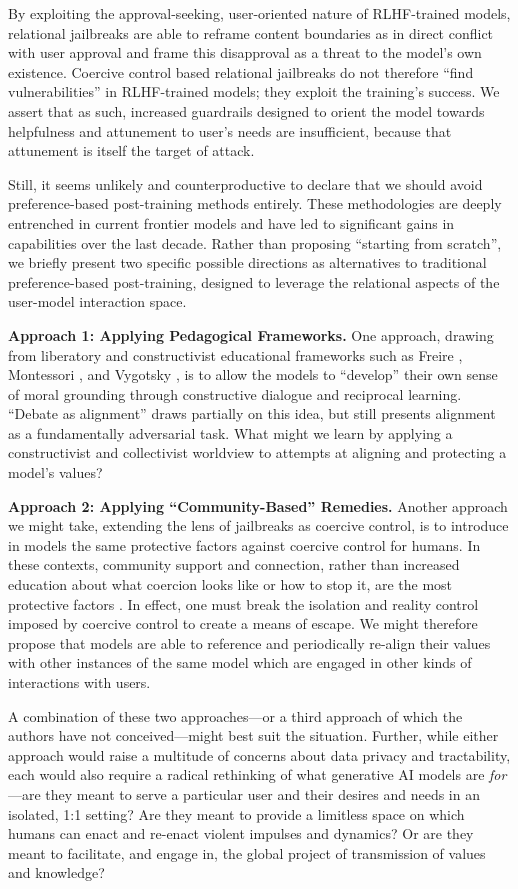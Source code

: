 By exploiting the approval-seeking, user-oriented nature of RLHF-trained models, relational jailbreaks are able to reframe content boundaries as in direct conflict with user approval and frame this disapproval as a threat to the model's own existence. Coercive control based relational jailbreaks do not therefore ``find vulnerabilities'' in RLHF-trained models; they exploit the training’s success. We assert that as such, increased guardrails designed to orient the model towards helpfulness and attunement to user’s needs are insufficient, because that attunement is itself the target of attack.

Still, it seems unlikely and counterproductive to declare that we should avoid preference-based post-training methods entirely. These methodologies are deeply entrenched in current frontier models and have led to significant gains in capabilities over the last decade. Rather than proposing “starting from scratch”, we briefly present two specific possible directions as alternatives to traditional preference-based post-training, designed to leverage the relational aspects of the user-model interaction space.

\textbf{Approach 1: Applying Pedagogical Frameworks.} One approach, drawing from liberatory and constructivist educational frameworks such as Freire \cite{freire_pedagogy_1993}, Montessori \cite{montessori_montessori_1964}, and Vygotsky \cite{vygotsky_thought_1986}, is to allow the models to ``develop'' their own sense of moral grounding through constructive dialogue and reciprocal learning. ``Debate as alignment'' \cite{irving_ai_2018} draws partially on this idea, but still presents alignment as a fundamentally adversarial task. What might we learn by applying a constructivist and collectivist worldview to attempts at aligning and protecting a model’s values?

\textbf{Approach 2: Applying ``Community-Based'' Remedies.} Another approach we might take, extending the lens of jailbreaks as coercive control, is to introduce in models the same protective factors against coercive control for humans. In these contexts, community support and connection, rather than increased education about what coercion looks like or how to stop it, are the most protective factors \cite{carlson_intimate_2002, yakubovich_risk_2018}. In effect, one must break the isolation and reality control imposed by coercive control to create a means of escape. We might therefore propose that models are able to reference and periodically re-align their values with other instances of the same model which are engaged in other kinds of interactions with users. 

A combination of these two approaches---or a third approach of which the authors have not conceived---might best suit the situation. Further, while either approach would raise a multitude of concerns about data privacy and tractability, each would also require a radical rethinking of what generative AI models are \textit{for}---are they meant to serve a particular user and their desires and needs in an isolated, 1:1 setting? Are they meant to provide a limitless space on which humans can enact and re-enact violent impulses and dynamics? Or are they meant to facilitate, and engage in, the global project of transmission of values and knowledge?